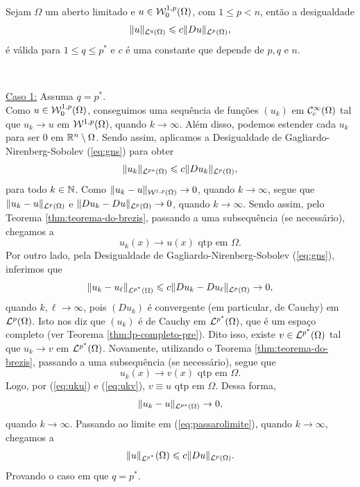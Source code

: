\begin{tbox} \label{thm:poincaregen}
    Sejam $\Omega$ um aberto limitado e $u \in \mathcal{W}^{1,p}_0(\Omega)$, com $1 \leqslant p < n$, então a desigualdade
    \begin{equation} \label{eq:poincaregen}
        \Vert u \Vert_{\mathcal{L}^q(\Omega)} \leqslant c \Vert Du \Vert_{\mathcal{L}^p(\Omega)},
    \end{equation}
    é válida para $1 \leqslant q \leqslant p^*$ e $c$ é uma constante que depende de $p, q$ e $n$.
\end{tbox}
\begin{prf} ~

    \underline{Caso 1:} Assuma $q = p^*$.\\
    Como $u \in \mathcal{W}^{1,p}_0(\Omega)$, conseguimos uma sequência de funções $(u_k)$ em $\mathcal{C}^{\infty}_c(\Omega)$ tal que $u_k \to u$ em $\mathcal{W}^{1,p}(\Omega)$, quando $k \to \infty$.
    Além disso, podemos estender cada $u_k$ para ser $0$ em $\mathbb{R}^n \setminus \Omega$.
    Sendo assim, aplicamos a Desigualdade de Gagliardo-Nirenberg-Sobolev (\ref{eq:gns}) para obter
    \begin{equation} \label{eq:passarolimite}
        \Vert u_k \Vert_{\mathcal{L}^{p*}(\Omega)} \leqslant c \Vert Du_k \Vert_{\mathcal{L}^p(\Omega)},
    \end{equation}
    para todo $k \in \mathbb{N}$.
    Como $\Vert u_k - u \Vert_{\mathcal{W}^{1,p}(\Omega)} \to 0$, quando $k \to \infty$, segue que $\Vert u_k - u \Vert_{\mathcal{L}^p(\Omega)}$ e $\Vert Du_k - Du \Vert_{\mathcal{L}^p(\Omega)} \to 0$, quando $k \to \infty$.
    Sendo assim, pelo Teorema \ref{thm:teorema-do-brezis}, passando a uma subsequência (se necessário), chegamos a
    \begin{equation} \label{eq:uku}
        u_k(x) \to u(x) \text{ qtp em } \Omega.
    \end{equation}
    Por outro lado, pela Desigualdade de Gagliardo-Nirenberg-Sobolev (\ref{eq:gns}), inferimos que
    \[
        \Vert u_k - u_\ell \Vert_{\mathcal{L}^{p^*}(\Omega)} \leqslant c \Vert Du_k - Du_\ell \Vert_{\mathcal{L}^p(\Omega)} \to 0,
    \]
    quando $k,\ell \to \infty$, pois $(Du_k)$ é convergente (em particular, de Cauchy) em $\mathcal{L}^p(\Omega)$. Isto nos diz que $(u_k)$ é de Cauchy em $\mathcal{L}^{p^*}(\Omega)$, que é um espaço completo (ver Teorema \ref{thm:lp-completo-pre}). Dito isso, existe $v \in \mathcal{L}^{p^*}(\Omega)$ tal que $u_k \to v$ em $\mathcal{L}^{p^*}(\Omega)$.
    Novamente, utilizando o Teorema \ref{thm:teorema-do-brezis}, passando a uma subsequência (se necessário), segue que
    \begin{equation} \label{eq:ukv}
        u_k(x) \to v(x) \text{ qtp em } \Omega.
    \end{equation}
    Logo, por (\ref{eq:uku}) e (\ref{eq:ukv}), $v \equiv u$ qtp em $\Omega$.
    Dessa forma,
    \[
        \Vert u_k - u \Vert_{\mathcal{L}^{p*}(\Omega)} \to 0,
    \]
    quando $k \to \infty$.
    Passando ao limite em (\ref{eq:passarolimite}), quando $k\to\infty$, chegamos a
    \[
        \Vert u \Vert_{\mathcal{L}^{p^*}}(\Omega) \leqslant c \Vert Du \Vert_{\mathcal{L}^p(\Omega)}.
    \]
    Provando o caso em que $q = p^*$. 
    

\end{prf}
